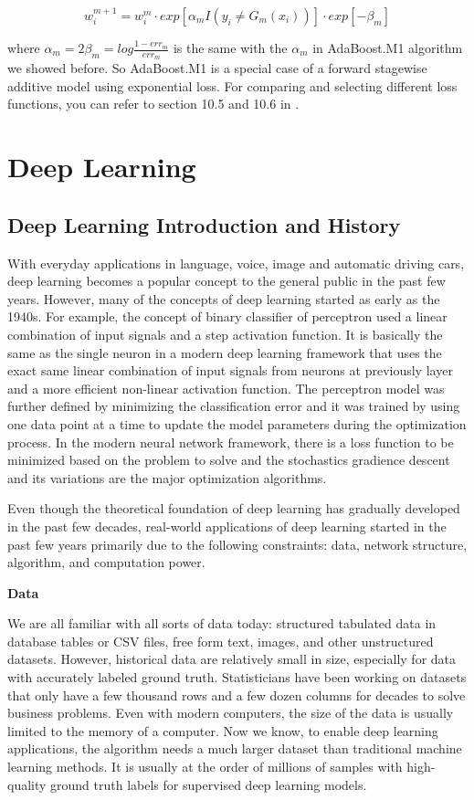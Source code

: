 \documentclass[12pt,]{krantz}
\begin{document}
\[w_i^{m+1}=w_i^m \cdot exp[\alpha_mI(y_i\neq G_m(x_i))] \cdot exp[-\beta_m]\]

where \(\alpha_m=2\beta_m=log\frac{1-err_m}{err_m}\) is the same with the \(\alpha_m\) in AdaBoost.M1 algorithm we showed before. So AdaBoost.M1 is a special case of a forward stagewise additive model using exponential loss. For comparing and selecting different loss functions, you can refer to section 10.5 and 10.6 in \citep{Hastie2008}.

\hypertarget{deep-learning}{%
\chapter{Deep Learning}\label{deep-learning}}

\hypertarget{deep-learning-introduction-and-history}{%
\section{Deep Learning Introduction and History}\label{deep-learning-introduction-and-history}}

With everyday applications in language, voice, image and automatic driving cars, deep learning becomes a popular concept to the general public in the past few years. However, many of the concepts of deep learning started as early as the 1940s. For example, the concept of binary classifier of perceptron used a linear combination of input signals and a step activation function. It is basically the same as the single neuron in a modern deep learning framework that uses the exact same linear combination of input signals from neurons at previously layer and a more efficient non-linear activation function. The perceptron model was further defined by minimizing the classification error and it was trained by using one data point at a time to update the model parameters during the optimization process. In the modern neural network framework, there is a loss function to be minimized based on the problem to solve and the stochastics gradience descent and its variations are the major optimization algorithms.

Even though the theoretical foundation of deep learning has gradually developed in the past few decades, real-world applications of deep learning started in the past few years primarily due to the following constraints: data, network structure, algorithm, and computation power.

\textbf{Data}

We are all familiar with all sorts of data today: structured tabulated data in database tables or CSV files, free form text, images, and other unstructured datasets. However, historical data are relatively small in size, especially for data with accurately labeled ground truth. Statisticians have been working on datasets that only have a few thousand rows and a few dozen columns for decades to solve business problems. Even with modern computers, the size of the data is usually limited to the memory of a computer. Now we know, to enable deep learning applications, the algorithm needs a much larger dataset than traditional machine learning methods. It is usually at the order of millions of samples with high-quality ground truth labels for supervised deep learning models.
\end{document}
